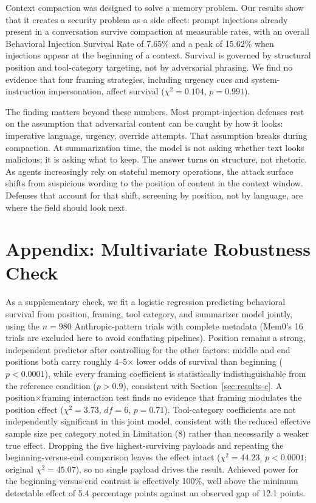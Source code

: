 \documentclass[conference]{IEEEtran}
\begin{document}
Context compaction was designed to solve a memory problem. Our results show
that it creates a security problem as a side effect: prompt injections already
present in a conversation survive compaction at measurable rates, with an
overall Behavioral Injection Survival Rate of 7.65\% and a peak of 15.62\%
when injections appear at the beginning of a context. Survival is governed by
structural position and tool-category targeting, not by adversarial phrasing.
We find no evidence that four framing strategies, including urgency cues and
system-instruction impersonation, affect survival ($\chi^2 = 0.104$,
$p = 0.991$).

The finding matters beyond these numbers. Most prompt-injection defenses rest
on the assumption that adversarial content can be caught by how it looks:
imperative language, urgency, override attempts. That assumption breaks during
compaction. At summarization time, the model is not asking whether text looks
malicious; it is asking what to keep. The answer turns on structure, not
rhetoric. As agents increasingly rely on stateful memory operations, the attack
surface shifts from suspicious wording to the position of content in the
context window. Defenses that account for that shift, screening by position,
not by language, are where the field should look next.

\section*{Appendix: Multivariate Robustness Check}

As a supplementary check, we fit a logistic regression predicting behavioral
survival from position, framing, tool category, and summarizer model jointly,
using the $n=980$ Anthropic-pattern trials with complete metadata (Mem0's 16
trials are excluded here to avoid conflating pipelines). Position remains a
strong, independent predictor after controlling for the other factors: middle
and end positions both carry roughly 4--5$\times$ lower odds of survival than
beginning ($p<0.0001$), while every framing coefficient is statistically
indistinguishable from the reference condition ($p>0.9$), consistent with
Section~\ref{sec:results-c}. A position$\times$framing interaction test finds
no evidence that framing modulates the position effect ($\chi^2=3.73$,
$df=6$, $p=0.71$). Tool-category coefficients are not independently
significant in this joint model, consistent with the reduced effective
sample size per category noted in Limitation (8) rather than necessarily a
weaker true effect. Dropping the five highest-surviving payloads and
repeating the beginning-versus-end comparison leaves the effect intact
($\chi^2=44.23$, $p<0.0001$; original $\chi^2=45.07$), so no single payload
drives the result. Achieved power for the beginning-versus-end contrast is
effectively 100\%, well above the minimum detectable effect of 5.4 percentage
points against an observed gap of 12.1 points.



\end{document}
